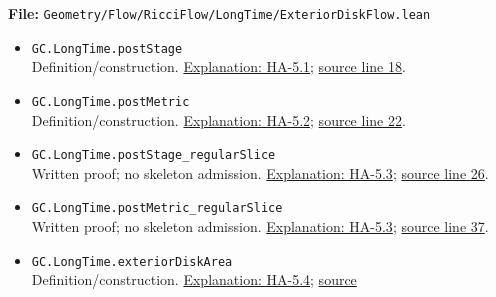 \documentclass[
  letterpaper,
  11pt]{article}
\begin{document}
\textbf{File:}
{\small\texttt{Geometry/\allowbreak{}Flow/\allowbreak{}Ricci\allowbreak{}Flow/\allowbreak{}Long\allowbreak{}Time/\allowbreak{}Exterior\allowbreak{}Disk\allowbreak{}Flow.\allowbreak{}lean}}

\begin{itemize}
\item
  {\small\texttt{GC.\allowbreak{}Long\allowbreak{}Time.\allowbreak{}post\allowbreak{}Stage}}\\
  Definition/construction. \hyperref[ha-5-1]{Explanation: HA-5.1};
  \href{https://github.com/qinz1yang/differential-geometry-dev/blob/ea0fae60ee01ef8c8d9b57a51794c6538f679c5d/DifferentialGeometry/Geometry/Flow/RicciFlow/LongTime/ExteriorDiskFlow.lean\#L18}{source
  line 18}.
\item
  {\small\texttt{GC.\allowbreak{}Long\allowbreak{}Time.\allowbreak{}post\allowbreak{}Metric}}\\
  Definition/construction. \hyperref[ha-5-2]{Explanation: HA-5.2};
  \href{https://github.com/qinz1yang/differential-geometry-dev/blob/ea0fae60ee01ef8c8d9b57a51794c6538f679c5d/DifferentialGeometry/Geometry/Flow/RicciFlow/LongTime/ExteriorDiskFlow.lean\#L22}{source
  line 22}.
\item
  {\small\texttt{GC.\allowbreak{}Long\allowbreak{}Time.\allowbreak{}post\allowbreak{}Stage\_\allowbreak{}regular\allowbreak{}Slice}}\\
  Written proof; no skeleton admission. \hyperref[ha-5-3]{Explanation:
  HA-5.3};
  \href{https://github.com/qinz1yang/differential-geometry-dev/blob/ea0fae60ee01ef8c8d9b57a51794c6538f679c5d/DifferentialGeometry/Geometry/Flow/RicciFlow/LongTime/ExteriorDiskFlow.lean\#L26}{source
  line 26}.
\item
  {\small\texttt{GC.\allowbreak{}Long\allowbreak{}Time.\allowbreak{}post\allowbreak{}Metric\_\allowbreak{}regular\allowbreak{}Slice}}\\
  Written proof; no skeleton admission. \hyperref[ha-5-3]{Explanation:
  HA-5.3};
  \href{https://github.com/qinz1yang/differential-geometry-dev/blob/ea0fae60ee01ef8c8d9b57a51794c6538f679c5d/DifferentialGeometry/Geometry/Flow/RicciFlow/LongTime/ExteriorDiskFlow.lean\#L37}{source
  line 37}.
\item
  {\small\texttt{GC.\allowbreak{}Long\allowbreak{}Time.\allowbreak{}exterior\allowbreak{}Disk\allowbreak{}Area}}\\
  Definition/construction. \hyperref[ha-5-4]{Explanation: HA-5.4};
  \href{https://github.com/qinz1yang/differential-geometry-dev/blob/ea0fae60ee01ef8c8d9b57a51794c6538f679c5d/DifferentialGeometry/Geometry/Flow/RicciFlow/LongTime/ExteriorDiskFlow.lean\#L57}{source
}
\end{itemize}
\end{document}
